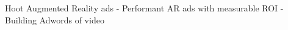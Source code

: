 \documentclass[10pt]{beamer}
\begin{document}

\begin{frame}{Hoot Augmented Reality ads - Performant AR ads with  measurable ROI - Building Adwords of video}
	
 	
\end{frame}
\end{document}
